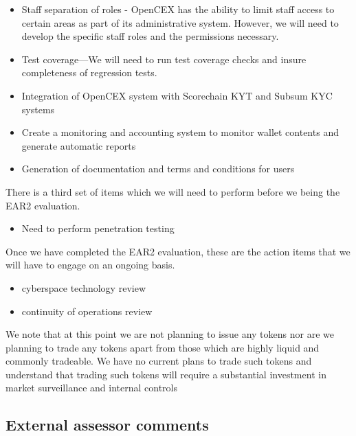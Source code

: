 \documentclass[]{report}
\begin{document}
\begin{itemize}

\item Staff separation of roles - OpenCEX has the ability to limit
  staff access to certain areas as part of its administrative system.
  However, we will need to develop the specific staff roles and the
  permissions necessary.

\item Test coverage—We will need to run test coverage checks and
  insure completeness of regression tests.

\item Integration of OpenCEX system with Scorechain KYT and Subsum KYC
  systems

\item Create a monitoring and accounting system to monitor wallet
  contents and generate automatic reports

\item Generation of documentation and terms and conditions for users

\end{itemize}

There is a third set of items which we will need to perform
before we being the EAR2 evaluation.

\begin{itemize}
\item Need to perform penetration testing
\end{itemize}

Once we have completed the EAR2 evaluation, these are the action items
that we will have to engage on an ongoing basis.

\begin{itemize}
\item cyberspace technology review
\item continuity of operations review
\end{itemize}

We note that at this point we are not planning to issue any tokens nor
are we planning to trade any tokens apart from those which are highly
liquid and commonly tradeable.  We have no current plans to trade such
tokens and understand that trading such tokens will require a
substantial investment in market surveillance and internal controls

\subsection{External assessor comments}
\end{document}
